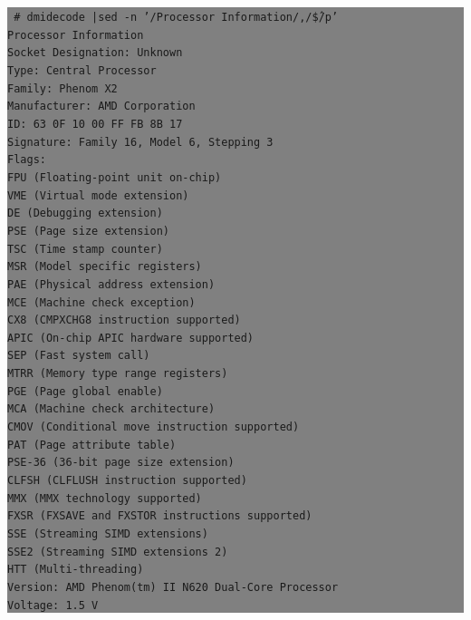 \documentclass[12pt]{article}
\begin{document}
\colorbox{grey}{\parbox[t]{0.95\linewidth}{ \vspace*{0.5cm} { 
{\tt
\# dmidecode |sed -n '/Processor Information/,/\^\$/p'\\
Processor Information\\
	Socket Designation: Unknown\\
	Type: Central Processor\\
	Family: Phenom X2\\
	Manufacturer: AMD Corporation\\
	ID: 63 0F 10 00 FF FB 8B 17\\
	Signature: Family 16, Model 6, Stepping 3\\
	Flags:\\
		FPU (Floating-point unit on-chip)\\
		VME (Virtual mode extension)\\
		DE (Debugging extension)\\
		PSE (Page size extension)\\
		TSC (Time stamp counter)\\
		MSR (Model specific registers)\\
		PAE (Physical address extension)\\
		MCE (Machine check exception)\\
		CX8 (CMPXCHG8 instruction supported)\\
		APIC (On-chip APIC hardware supported)\\
		SEP (Fast system call)\\
		MTRR (Memory type range registers)\\
		PGE (Page global enable)\\
		MCA (Machine check architecture)\\
		CMOV (Conditional move instruction supported)\\
		PAT (Page attribute table)\\
		PSE-36 (36-bit page size extension)\\
		CLFSH (CLFLUSH instruction supported)\\
		MMX (MMX technology supported)\\
		FXSR (FXSAVE and FXSTOR instructions supported)\\
		SSE (Streaming SIMD extensions)\\
		SSE2 (Streaming SIMD extensions 2)\\
		HTT (Multi-threading)\\
	Version: AMD Phenom(tm) II N620 Dual-Core Processor\\
	Voltage: 1.5 V\\
}}}}
\end{document}
